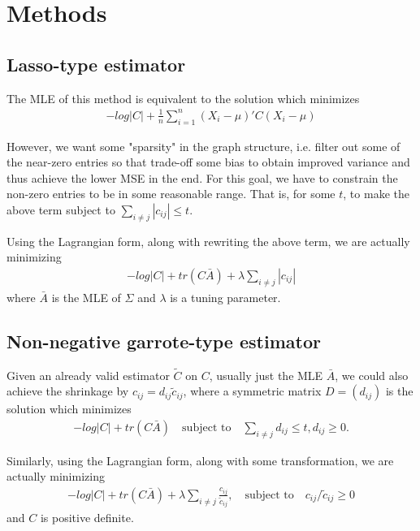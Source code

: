
\section*{Methods}
\subsection*{Lasso-type estimator}
The MLE of this method is equivalent to the solution which minimizes 
\begin{align*}
    -log|C| + \frac{1}{n}\sum_{i=1}^n (X_i - \mu)' C (X_i - \mu)
\end{align*}

However, we want some "sparsity" in the graph structure, i.e. filter out some of the near-zero entries so that trade-off some bias to obtain improved variance and thus achieve the lower MSE in the end. For this goal, we have to constrain the non-zero entries to be in some reasonable range. That is, for some $t$, to make the above term subject to $\sum_{i \neq j} |c_{ij}| \leq t$.

Using the Lagrangian form, along with rewriting the above term, we are actually minimizing 
\begin{align*}
    -log|C| + tr(C \bar{A}) + \lambda \sum_{i \neq j} |c_{ij}| \tag{1}
\end{align*}
where $\bar{A}$ is the MLE of $\Sigma$ and $\lambda$ is a tuning parameter. 

\subsection*{Non-negative garrote-type estimator}
Given an already valid estimator $\tilde{C}$ on $C$, usually just the MLE $\bar{A}$, we could also achieve the shrinkage by $c_{ij} = d_{ij}\tilde{c}_{ij}$, where a symmetric matrix $D=(d_{ij})$ is the solution which minimizes
\begin{align*}
    -log|C| + tr(C \bar{A}) \quad \text{subject to} \quad \sum_{i \neq j} d_{ij} \leq t, d_{ij} \geq 0.
\end{align*}

Similarly, using the Lagrangian form, along with some transformation, we are actually minimizing 
\begin{align*}
    -log|C| + tr(C \bar{A}) + \lambda \sum_{i \neq j} \frac{c_{ij}}{\tilde{c}_{ij}}, \quad \text{subject to} \quad c_{ij}/\tilde{c}_{ij} \geq 0 \tag{2}
\end{align*}
and $C$ is positive definite. 

